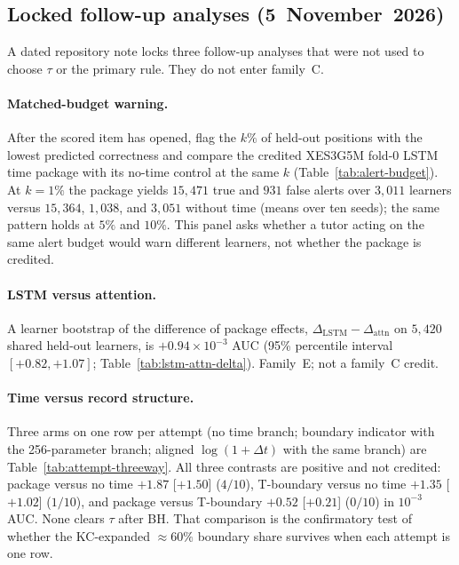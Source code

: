 \documentclass[review,12pt]{elsarticle}
\begin{document}


\subsection{Locked follow-up analyses (5~November~2026)}
\label{sec:nov5-followup}
A dated repository note locks three follow-up analyses that were not
used to choose $\tau$ or the primary rule. They do not enter family~C.

\paragraph{Matched-budget warning.}
After the scored item has opened, flag the $k\%$ of held-out positions
with the lowest predicted correctness and compare the credited
XES3G5M fold-0 LSTM time package with its no-time control at the same
$k$ (Table~\ref{tab:alert-budget}). At $k{=}1\%$ the package yields
$15{,}471$ true and $931$ false alerts over $3{,}011$ learners versus
$15{,}364$, $1{,}038$, and $3{,}051$ without time (means over ten seeds);
the same pattern holds at $5\%$ and $10\%$. This panel asks whether a tutor
acting on the same alert budget would warn different learners, not
whether the package is credited.

\paragraph{LSTM versus attention.}
A learner bootstrap of the difference of package effects,
$\Delta_{\mathrm{LSTM}}-\Delta_{\mathrm{attn}}$ on $5{,}420$ shared held-out
learners, is $+0.94\times 10^{-3}$ AUC (95\% percentile interval
$[+0.82,+1.07]$; Table~\ref{tab:lstm-attn-delta}). Family~E; not a
family~C credit.

\paragraph{Time versus record structure.}
Three arms on one row per attempt (no time branch; boundary indicator
with the 256-parameter branch; aligned $\log(1{+}\Delta t)$ with the
same branch) are Table~\ref{tab:attempt-threeway}. All three contrasts
are positive and not credited: package versus no time
$+1.87$ [$+1.50$] ($4/10$), T-boundary versus no time
$+1.35$ [$+1.02$] ($1/10$), and package versus T-boundary
$+0.52$ [$+0.21$] ($0/10$) in $10^{-3}$ AUC. None clears $\tau$ after BH.
That comparison is the confirmatory test of whether the KC-expanded
$\approx 60\%$ boundary share survives when each attempt is one row.
\end{document}
